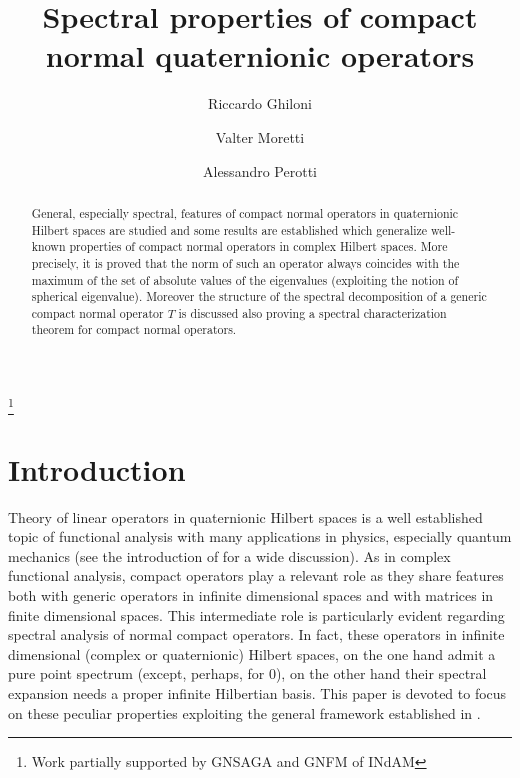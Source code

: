 \documentclass{birkmult}
\theoremstyle{definition}
\theoremstyle{remark}
\numberwithin{equation}{section}
\begin{document}
\title{Spectral properties of compact normal quaternionic operators}

\author{Riccardo Ghiloni}
\address{Department of Mathematics, University of Trento, I--38123, Povo-Trento, Italy}
\thanks{Work partially supported by GNSAGA and  GNFM of INdAM}

\author{Valter Moretti}
\address{Department of Mathematics, University of Trento, I--38123, Povo-Trento, Italy}

\author{Alessandro Perotti}
\address{Department of Mathematics, University of Trento, I--38123, Povo-Trento, Italy}


\date{}

\begin{abstract}
General, especially spectral, features of compact normal operators in quaternionic Hilbert spaces are studied and some results are established which generalize well-known properties of compact normal operators in complex Hilbert spaces. More precisely, it is proved that 
the norm of such an operator always coincides with the maximum of the set of absolute values of the eigenvalues (exploiting the notion of spherical eigenvalue). Moreover the structure of the spectral decomposition of a generic compact normal operator $T$ is discussed also proving a spectral characterization theorem for compact normal operators.
\end{abstract}

\maketitle

\section{Introduction} 

\medskip
Theory of linear operators in quaternionic Hilbert spaces is a well established topic of functional analysis with many applications in physics, especially quantum mechanics (see the introduction of \cite{GhMoPe} for a wide discussion). 
As in complex functional analysis, compact operators play a relevant role as they share features both with generic operators in  infinite dimensional spaces and with matrices in finite dimensional spaces. This intermediate role is particularly evident regarding spectral analysis of normal compact operators. In fact, these operators in infinite dimensional (complex or quaternionic) Hilbert spaces,  on the one hand 
admit a pure point spectrum (except, perhaps, for $0$), on the other hand their spectral expansion needs a proper infinite Hilbertian basis.
This paper is devoted to focus on these peculiar properties exploiting the general framework established in \cite{GhMoPe}.
\end{document}
